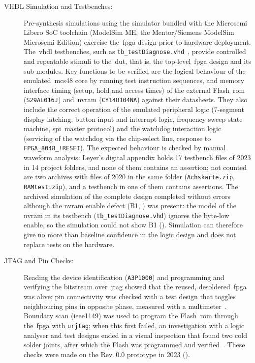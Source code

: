 \begin{description}
	\item[VHDL Simulation and Testbenches:] Pre-synthesis simulations using the simulator bundled with the Microsemi Libero SoC toolchain (ModelSim ME, the Mentor/Siemens ModelSim Microsemi Edition) exercise the~\gls{fpga} design prior to hardware deployment. The~\gls{vhdl} testbenches, such as \texttt{tb\_testDiagnose.vhd}~\cite{leyer2023}, provide controlled and repeatable stimuli to the~\gls{dut}, that is, the top-level~\gls{fpga} design and its sub-modules. Key functions to be verified are the logical behaviour of the emulated~\gls{mcs48} core by running test instruction sequences, and memory interface timing (setup, hold and access times) of the external Flash~\gls{rom} (\texttt{S29AL016J}) and~\gls{nvram} (\texttt{CY14B104NA}) against their datasheets. They also include the correct operation of the emulated peripheral logic (7-segment display latching, button input and interrupt logic, frequency sweep state machine, \gls{spi}~master protocol) and the watchdog interaction logic (servicing of the watchdog via the chip-select line, response to \texttt{FPGA\_8048\_!RESET}). The expected behaviour is checked by manual waveform analysis: Leyer's digital appendix holds 17 testbench files of 2023 in 14 project folders, and none of them contains an assertion; not counted are two archives with files of 2020 in the same folder (\texttt{Achskarte.zip}, \texttt{RAMtest.zip}), and a testbench in one of them contains assertions. The archived simulation of the complete design completed without errors although the \gls{nvram} enable defect (B1, ) was present: the model of the \gls{nvram} in its testbench (\texttt{tb\_testDiagnose.vhd}) ignores the byte-low enable, so the simulation could not show B1 (). Simulation can therefore give no more than baseline confidence in the logic design and does not replace tests on the hardware.
	\item[JTAG and Pin Checks:] Reading the device identification (\texttt{A3P1000}) and programming and verifying the bitstream over~\gls{jtag} showed that the reused, desoldered~\gls{fpga} was alive; pin connectivity was checked with a test design that toggles neighbouring pins in opposite phase, measured with a multimeter~\cite{leyer2023}. Boundary scan (\gls{ieee1149}) was used to program the Flash~\gls{rom} through the~\gls{fpga} with \texttt{urjtag}; when this first failed, an investigation with a logic analyser and test designs ended in a visual inspection that found two cold solder joints, after which the Flash was programmed and verified~\cite[Sec.~4.3]{leyer2023}. These checks were made on the Rev~0.0 prototype in 2023 ().

\end{description}
